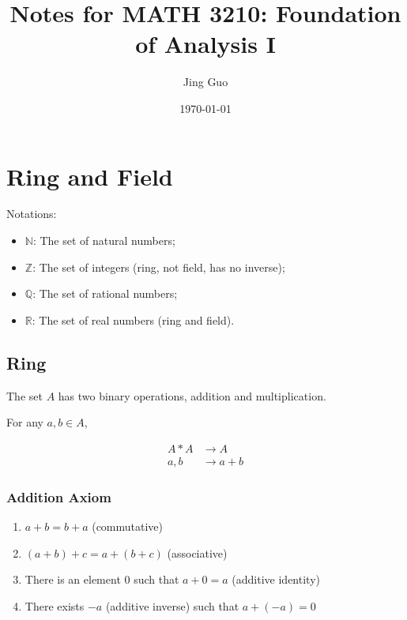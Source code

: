 \documentclass{article}
\title{Notes for MATH 3210: Foundation of Analysis I}
\author{Jing Guo}
\date{\today}
\begin{document}
    \maketitle
    \tableofcontents
    
    \section{Ring and Field}
    
    Notations:
    
    \begin{itemize}
        \item $\mathbb{N}$: The set of natural numbers;
        \item $\mathbb{Z}$: The set of integers (ring, not field, has no inverse);
        \item $\mathbb{Q}$: The set of rational numbers;
        \item $\mathbb{R}$: The set of real numbers (ring and field).
    \end{itemize}
    
    \subsection{Ring}
    
    The set $A$ has two binary operations, addition and multiplication.
    
    For any $a, b \in A$,
    
    \begin{align*}
        A \ast A &\to A \\
        a, b &\to a + b
    \end{align*}
    
    \subsubsection{Addition Axiom}

    \begin{enumerate}
        \item $a + b = b + a$ (commutative)
        \item $(a + b) + c = a + (b + c)$ (associative)
        \item There is an element $0$ such that $a + 0 = a$ (additive identity)
        \item There exists $-a$ (additive inverse) such that $a + (-a) = 0$
    \end{enumerate}
\end{document}
